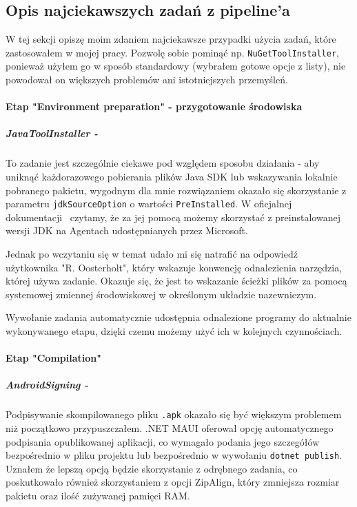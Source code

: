 \subsection{Opis najciekawszych zadań z pipeline'a}

W tej sekcji opiszę moim zdaniem najciekawsze przypadki użycia zadań, które zastosowałem 
w mojej pracy. Pozwolę sobie pominąć np. \verb|NuGetToolInstaller|, ponieważ użyłem 
go w sposób standardowy (wybrałem gotowe opcje z listy), nie powodował on większych problemów
ani istotniejszych przemyśleń.

\paragraph{Etap "Environment preparation" - przygotowanie środowiska}

\subparagraph{JavaToolInstaller -} \label{javaTask}
To zadanie jest szczególnie ciekawe pod względem sposobu działania - aby uniknąć każdorazowego 
pobierania plików Java SDK lub wskazywania lokalnie pobranego pakietu, wygodnym dla mnie 
rozwiązaniem okazało się skorzystanie z parametru \verb|jdkSourceOption| o wartości \verb|PreInstalled|.
W oficjalnej dokumentacji~\cite{jdkSourceOption} czytamy, że za jej pomocą możemy skorzystać 
z preinstalowanej wersji JDK na Agentach udostępnianych przez Microsoft.

Jednak po wczytaniu się w temat udało mi się natrafić na odpowiedź~\cite{javaToolInstaller_StackOverflow} 
użytkownika "R. Oosterholt", który wskazuje konwencję odnalezienia narzędzia, której używa zadanie.
Okazuje się, że jest to wskazanie ścieżki plików za pomocą systemowej zmiennej środowiskowej w określonym 
układzie nazewniczym.

Wywołanie zadania automatycznie udostępnia odnalezione programy do aktualnie wykonywanego etapu, dzięki czemu 
możemy użyć ich w kolejnych czynnościach.

\paragraph{Etap "Compilation"}
\subparagraph{AndroidSigning -}
Podpisywanie skompilowanego pliku \verb|.apk| okazało się być większym problemem niż początkowo przypuszczałem.
.NET MAUI oferował opcję automatycznego podpisania opublikowanej aplikacji, co wymagało podania jego szczegółów 
bezpośrednio w pliku projektu lub bezpośrednio w wywołaniu \verb|dotnet publish|.
Uznałem że lepszą opcją będzie skorzystanie z odrębnego zadania, co poskutkowało również skorzystaniem z opcji 
ZipAlign, który zmniejsza rozmiar pakietu oraz ilość zużywanej pamięci RAM.
